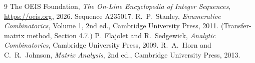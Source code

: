 \documentclass[11pt,a4paper]{article}
\theoremstyle{plain}
\theoremstyle{definition}
\begin{document}
\begin{thebibliography}{9}
 The OEIS Foundation, \emph{The On-Line Encyclopedia of Integer
Sequences}, \url{https://oeis.org}, 2026. Sequence A235017.
 R.~P.~Stanley, \emph{Enumerative Combinatorics}, Volume 1, 2nd ed.,
Cambridge University Press, 2011. (Transfer-matrix method, Section 4.7.)
 P.~Flajolet and R.~Sedgewick, \emph{Analytic Combinatorics}, Cambridge
University Press, 2009.
 R.~A.~Horn and C.~R.~Johnson, \emph{Matrix Analysis}, 2nd ed., Cambridge
University Press, 2013.
\end{thebibliography}
\end{document}
